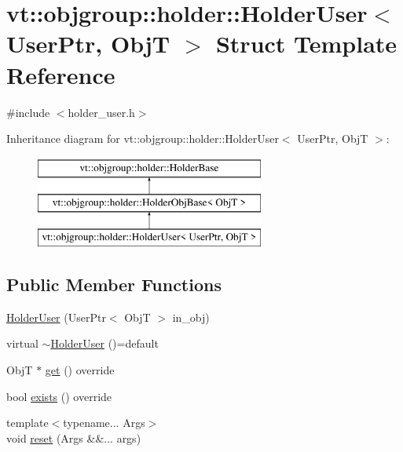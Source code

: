 \hypertarget{structvt_1_1objgroup_1_1holder_1_1_holder_user}{}\section{vt\+:\+:objgroup\+:\+:holder\+:\+:Holder\+User$<$ User\+Ptr, ObjT $>$ Struct Template Reference}
\label{structvt_1_1objgroup_1_1holder_1_1_holder_user}


{\ttfamily \#include $<$holder\+\_\+user.\+h$>$}

Inheritance diagram for vt\+:\+:objgroup\+:\+:holder\+:\+:Holder\+User$<$ User\+Ptr, ObjT $>$\+:\begin{figure}[H]
\begin{center}
\leavevmode
\includegraphics[height=3.000000cm]{structvt_1_1objgroup_1_1holder_1_1_holder_user}
\end{center}
\end{figure}
\subsection*{Public Member Functions}
\begin{DoxyCompactItemize}
\item 
\hyperlink{structvt_1_1objgroup_1_1holder_1_1_holder_user_a5c81ffca6d44450a02c9d74c650d2178}{Holder\+User} (User\+Ptr$<$ ObjT $>$ in\+\_\+obj)
\item 
virtual \hyperlink{structvt_1_1objgroup_1_1holder_1_1_holder_user_a694de38808a7075ef8fa919d9e983c8b}{$\sim$\+Holder\+User} ()=default
\item 
ObjT $\ast$ \hyperlink{structvt_1_1objgroup_1_1holder_1_1_holder_user_a102b494316b9f906a02f1c47b797e339}{get} () override
\item 
bool \hyperlink{structvt_1_1objgroup_1_1holder_1_1_holder_user_abba92cc4a99e045b64a1865fe1477fb2}{exists} () override
\item 
{\footnotesize template$<$typename... Args$>$ }\\void \hyperlink{structvt_1_1objgroup_1_1holder_1_1_holder_user_a4a43e5b38a0474cd523ccd9aa66950e9}{reset} (Args \&\&... args)
\end{DoxyCompactItemize}


